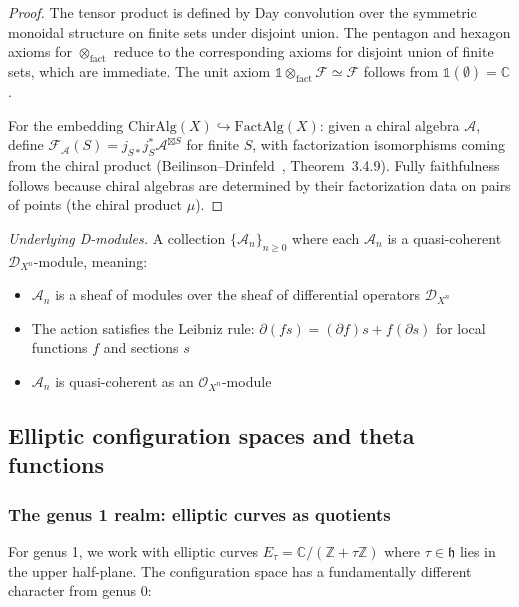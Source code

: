 \begin{proof}
The tensor product is defined by Day convolution over the symmetric monoidal structure on finite sets under disjoint union.  The pentagon and hexagon axioms for $\otimes_{\mathrm{fact}}$ reduce to the corresponding axioms for disjoint union of finite sets, which are immediate.  The unit axiom $\mathbb{1} \otimes_{\mathrm{fact}} \mathcal{F} \simeq \mathcal{F}$ follows from $\mathbb{1}(\emptyset) = \mathbb{C}$.

For the embedding $\mathrm{ChirAlg}(X) \hookrightarrow \mathrm{FactAlg}(X)$: given a chiral algebra $\mathcal{A}$, define $\mathcal{F}_{\mathcal{A}}(S) = j_{S*}j_S^*\mathcal{A}^{\boxtimes S}$ for finite $S$, with factorization isomorphisms coming from the chiral product (Beilinson--Drinfeld~\cite{BD04}, Theorem~3.4.9).  Fully faithfulness follows because chiral algebras are determined by their factorization data on pairs of points (the chiral product $\mu$).
\end{proof}

\emph{Underlying D-modules.} A collection $\{\mathcal{A}_n\}_{n \geq 0}$ where each $\mathcal{A}_n$ is a quasi-coherent $\mathcal{D}_{X^n}$-module, meaning:
\begin{itemize}
\item $\mathcal{A}_n$ is a sheaf of modules over the sheaf of differential operators $\mathcal{D}_{X^n}$
\item The action satisfies the Leibniz rule: $\partial(fs) = (\partial f)s + f(\partial s)$ for local functions $f$ and sections $s$
\item $\mathcal{A}_n$ is quasi-coherent as an $\mathcal{O}_{X^n}$-module
\end{itemize}

\subsection{Elliptic configuration spaces and theta functions}

\subsubsection{The genus 1 realm: elliptic curves as quotients}

For genus 1, we work with elliptic curves $E_\tau = \mathbb{C}/(\mathbb{Z} + \tau\mathbb{Z})$ where $\tau \in \mathfrak{h}$ lies in the upper half-plane. The configuration space has a fundamentally different character from genus 0:


